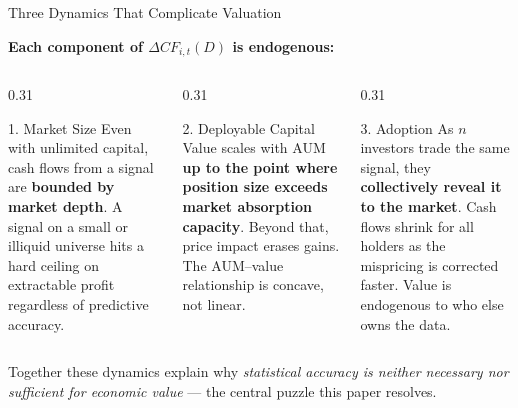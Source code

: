 \documentclass[12pt, aspectratio=169]{beamer}
\begin{document}
\begin{frame}{Three Dynamics That Complicate Valuation}

\small\textbf{Each component of $\Delta CF_{i,t}(D)$ is endogenous:}

\smallskip
\begin{columns}[T]

\begin{column}{0.31\textwidth}
\begin{block}{\centering\small 1.\; Market Size}
\footnotesize\smallskip
Even with unlimited capital, cash flows from a signal are \textbf{bounded
by market depth}. A signal on a small or illiquid universe hits a hard
ceiling on extractable profit regardless of predictive accuracy.
\end{block}
\end{column}

\begin{column}{0.31\textwidth}
\begin{block}{\centering\small 2.\; Deployable Capital}
\footnotesize\smallskip
Value scales with AUM \textbf{up to the point where position size exceeds
market absorption capacity}. Beyond that, price impact erases gains.
The AUM--value relationship is concave, not linear.
\end{block}
\end{column}

\begin{column}{0.31\textwidth}
\begin{block}{\centering\small 3.\; Adoption}
\footnotesize\smallskip
As $n$ investors trade the same signal, they \textbf{collectively reveal it
to the market}. Cash flows shrink for all holders as the mispricing is
corrected faster. Value is endogenous to who else owns the data.
\end{block}
\end{column}

\end{columns}

\medskip
{\small
Together these dynamics explain why \emph{statistical accuracy is neither
necessary nor sufficient for economic value} --- the central puzzle this
paper resolves.}

\end{frame}
\end{document}
